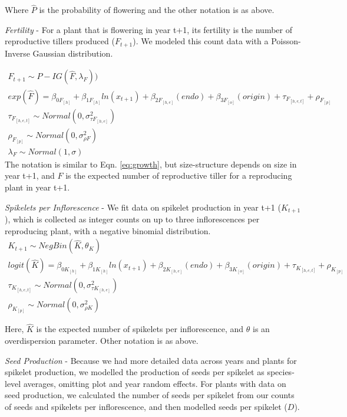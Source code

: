 \documentclass[12pt]{article}
\begin{document}
Where $\hat{P}$ is the probability of flowering and the other notation is as above.

\emph{Fertility} - For a plant that is flowering in year t+1, its fertility is the number of reproductive tillers produced ($F_{t+1}$). 
We modeled this count data with a Poisson-Inverse Gaussian distribution.

\begin{subequations} 
	\label{eq:fertility}
	\begin{align}
		F_{t+1} \sim P-IG(\hat{F},\lambda_{F})) \\
		exp(\hat{F}) =  \beta_{0F_{[h]}} + \beta_{1F_{[h]}}ln(x_{t+1}) + \beta_{2F_{[h,e]}}(endo) + \beta_{3F_{[o]}}(origin) + \tau_{F_{[h,e,t]}} + \rho_{F_{[p]}} \\
		\tau_{F_{[h,e,t]}} \sim Normal(0, \sigma^2_{\tau F_{[h,e]}})\\
		\rho_{F_{[p]}} \sim Normal(0, \sigma^2_{\rho F})\\
		\lambda_{F} \sim Normal(1,\sigma)
	\end{align}
\end{subequations}
The notation is similar to Eqn. \ref{eq:growth}, but size-structure depends on size in year t+1, and $\hat{F}$ is the expected number of reproductive tiller for a reproducing plant in year t+1.

\emph{Spikelets per Inflorescence} - We fit data on spikelet production in year t+1 ($K_{t+1}$), which is collected as integer counts on up to three inflorescences per reproducing plant, with a negative binomial distribution. 
\begin{subequations} 
	\label{eq:spikelets}
	\begin{align}
		K_{t+1} \sim NegBin(\hat{K}, \theta_K) \\
		logit(\hat{K}) =  \beta_{0K_{[h]}} + \beta_{1K_{[h]}}ln(x_{t+1}) + \beta_{2K_{[h,e]}}(endo) + \beta_{3K_{[o]}}(origin) + \tau_{K_{[h,e,t]}} + \rho_{K_{[p]}} \\
		\tau_{K_{[h,e,t]}} \sim Normal(0, \sigma^2_{\tau K_{[h,e]}})\\
		\rho_{K_{[p]}} \sim Normal(0, \sigma^2_{\rho K})
	\end{align}
\end{subequations}

Here, $\hat{K}$ is the expected number of spikelets per inflorescence, and $\theta$ is an overdispersion parameter. Other notation is as above.  

\emph{Seed Production} - Because we had more detailed data across years and plants for spikelet production, we modelled the production of seeds per spikelet as species-level averages, omitting plot and year random effects. For plants with data on seed production, we calculated the number of seeds per spikelet from our counts of seeds and spikelets per inflorescence, and then modelled seeds per spikelet ($D$).
\end{document}
